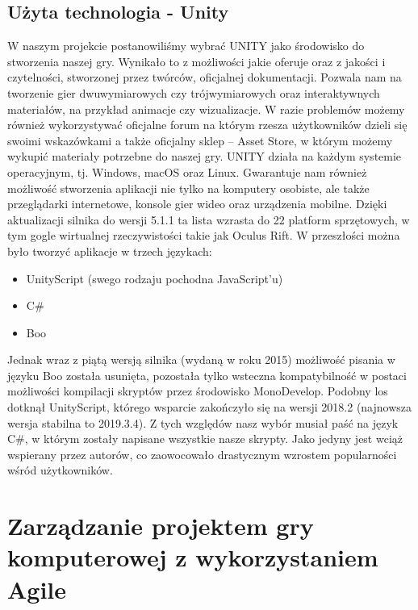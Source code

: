 \documentclass[oneside,polski,logo]{amuthesis}
\begin{document}
\section{Użyta technologia - Unity}
 W naszym projekcie postanowiliśmy wybrać UNITY jako środowisko do stworzenia naszej gry. Wynikało to z możliwości jakie oferuje oraz z jakości i czytelności, stworzonej przez twórców, oficjalnej dokumentacji. Pozwala nam na tworzenie gier dwuwymiarowych czy trójwymiarowych oraz interaktywnych materiałów, na przykład animacje czy wizualizacje. W razie problemów możemy również wykorzystywać oficjalne forum na którym rzesza użytkowników dzieli się swoimi wskazówkami a także oficjalny sklep – Asset Store, w którym możemy wykupić materiały potrzebne do naszej gry. UNITY działa na każdym systemie operacyjnym, tj. Windows, macOS oraz Linux. Gwarantuje nam również możliwość stworzenia aplikacji nie tylko na komputery osobiste, ale także przeglądarki internetowe, konsole gier wideo oraz urządzenia mobilne. Dzięki aktualizacji silnika do wersji 5.1.1 ta lista wzrasta do 22 platform sprzętowych, w tym gogle wirtualnej rzeczywistości takie jak Oculus Rift.
W przeszłości można było tworzyć aplikacje w trzech językach:
\begin{itemize}
	\item UnityScript (swego rodzaju pochodna JavaScript’u)
	\item C\#
	\item Boo
\end{itemize}
Jednak wraz z piątą wersją silnika (wydaną w roku 2015) możliwość pisania w języku Boo została usunięta, pozostała tylko wsteczna kompatybilność w postaci możliwości kompilacji skryptów przez środowisko MonoDevelop. Podobny los dotknął UnityScript, którego wsparcie zakończyło się na wersji 2018.2 (najnowsza wersja stabilna to 2019.3.4). Z tych względów nasz wybór musiał paść na język C\#, w którym zostały napisane wszystkie nasze skrypty. Jako jedyny jest wciąż wspierany przez autorów, co zaowocowało drastycznym wzrostem popularności wśród użytkowników.\cite{unity}

\chapter{Zarządzanie projektem gry komputerowej z wykorzystaniem Agile}
\end{document}
